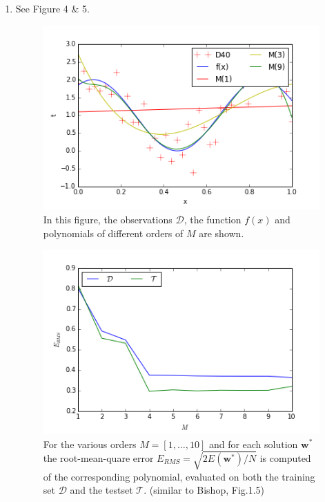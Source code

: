 \documentclass[a4paper,11pt]{article}
\theoremstyle{mytheor}
\begin{document}
\begin{enumerate}
\begin{figure}[h]
		\end{figure}\vspace{-0.5cm}
	\item See Figure 4 \& 5.
		\begin{figure}[h!]
			\centering
			\includegraphics[scale=0.8]{1_2_40.png}\vspace{-0.5cm}
			\caption{\vspace{-0.2cm} In this figure, the observations $\mathcal{D}$, the function $f(x)$ and polynomials of different orders of $M$ are shown.}
		\end{figure}
		\begin{figure}[h!]
			\centering
			\includegraphics[scale=0.8]{1_3_40.png}\vspace{-0.5cm}
			\caption{\vspace{-0.2cm} For the various orders $M = [1,\hdots,10]$ and for each solution $\boldsymbol{w}^*$ the root-mean-quare error $E_{RMS} = \sqrt{2E(\boldsymbol{w}^*)/N}$ is computed of the corresponding polynomial, evaluated on both the training set $\mathcal{D}$ and the testset $\mathcal{T}$. (similar to Bishop, Fig.1.5)}

\end{figure}
\end{enumerate}
\end{document}
